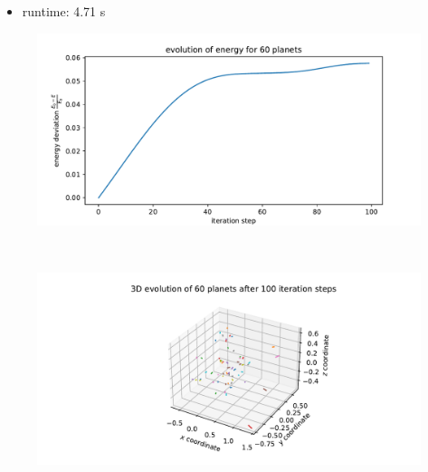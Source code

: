        \newpage
        \begin{itemize}
            \item runtime: 4.71 s
        \end{itemize}
        \begin{figure}[h!]
            \centering
            \includegraphics[width=\textwidth]{./figures/task2_60body_energy_new_e.pdf}
        \end{figure} \ \\ 
        \begin{figure}[h!]
            \centering
            \includegraphics[width=\textwidth]{./figures/task2_60body_3D_new_e.pdf}
        \end{figure} \ \\ 
